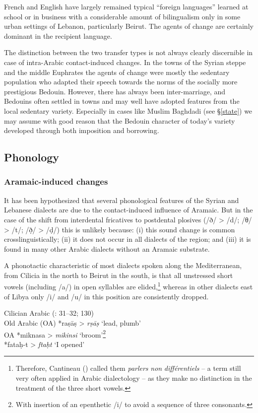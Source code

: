 \documentclass[output=paper]{langsci/langscibook}
\begin{document}
French and English have largely remained typical “foreign languages” learned at school or in business with a considerable amount of bilingualism only in some urban settings of Lebanon, particularly Beirut. The agents of change are certainly dominant in the recipient language. 

The distinction between the two transfer types is not always clearly discernible in case of intra-Arabic contact-induced changes. In the towns of the Syrian steppe and the middle Euphrates the agents of change were mostly the sedentary population who adapted their speech towards the norms of the socially more prestigious Bedouin. However, there has always been inter-marriage, and Bedouins often settled in towns and may well have adopted features from the local sedentary variety. Especially in cases like Muslim Baghdadi (see §\ref{state}) we may assume with good reason that the Bedouin character of today’s variety developed through both imposition and borrowing. 

  \subsection{Phonology} 
 \subsubsection{Aramaic-induced changes} 

It has been hypothesized that several phonological features of the Syrian and Lebanese dialects are due to the contact-induced influence of Aramaic. But in the case of the shift from interdental fricatives to postdental plosives (/ð/ > /d/; /θ/ > /t/; /ð̣/ > /ḍ/) this is unlikely because: (i) this sound change is common crosslinguistically; (ii) it does not occur in all dialects of the region; and (iii) it is found in many other Arabic dialects without an Aramaic substrate. 

A phonotactic characteristic of most dialects spoken along the Mediterranean, from Cilicia in the north to Beirut in the south, is that all unstressed short vowels (including /a/) in open syllables are elided,\footnote{Therefore, Cantineau (\citeyear[108]{Cantineau1960book}) called them \textit{parlers} \textit{non} \textit{différentiels} – a term still very often applied in Arabic dialectology – as they make no distinction in the treatment of the three short vowels.} whereas in other dialects east of Libya only /i/ and /u/ in this position are consistently dropped.

\ea
{Cilician Arabic (\citealt{Procházka2002Cukurova}: 31--32; 130)}\\
  \textup{Old Arabic (OA)} *raṣāṣ > \textit{rṣāṣ}  \textup{‘lead, plumb’\\
OA} *miknasa > \textit{mikinsi} ‘\textup{broom’}\footnote{With insertion of an epenthetic /i/ to avoid a sequence of three consonants.}\\
*fataḥ-t > \textit{ftaḥt} ‘\textup{I opened’}\\
  \z
  
\end{document}

